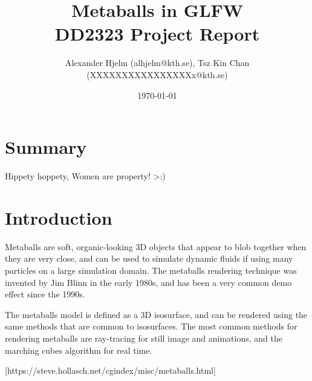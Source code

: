\documentclass{article}
\begin{document}
    \title{%
      Metaballs in GLFW \\
      \large DD2323 Project Report \\}

    \author{Alexander Hjelm (alhjelm@kth.se), Tsz Kin Chan (XXXXXXXXXXXXXXXXx@kth.se)}

    \date{\today}

    \maketitle

    \section{Summary}
    Hippety hoppety, Women are property! >:)
    
    \section{Introduction}
    
    Metaballs are soft, organic-looking 3D objects that appear to blob together when they are very close, and can be used to simulate dynamic fluids if using many particles on a large simulation domain. 
    The metaballs rendering technique was invented by Jim Blinn in the early 1980s, and has been a very common demo effect since the 1990s.

    The metaballs model is defined as a 3D isosurface, and can be rendered using the same methods that are common to isosurfaces.
    The most common methods for rendering metaballs are ray-tracing for still image and animations, and the marching cubes algorithm for real time.

    [https://steve.hollasch.net/cgindex/misc/metaballs.html]
\end{document}
